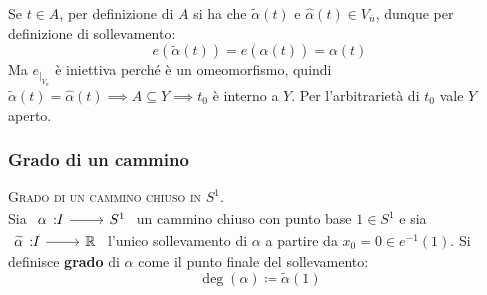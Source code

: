 \begin{demonstration}
\begin{itemize}
	Se $t\in A$, per definizione di $A$ si ha che $\widetilde{\alpha}(t)$ e $\widehat{\alpha}(t)\in V_{\overline{n}}$, dunque per definizione di sollevamento:
	\begin{equation*}
		e\left( \widetilde{\alpha}(t) \right)= e\left( \widehat{\alpha}(t) \right)= \alpha(t)
	\end{equation*} 
	Ma $e_{\mid_{V_{\overline{n}}}}$ è iniettiva perché è un omeomorfismo, quindi $\widetilde{\alpha}(t)=\widehat{\alpha}(t) \implies A\subseteq Y \implies t_0$ è interno a $Y$. Per l'arbitrarietà di $t_0$ vale $Y$ aperto.
	\end{itemize}
\vspace{-3mm}
\end{demonstration}

\subsubsection{Grado di un cammino}
\begin{define} \textsc{Grado di un cammino chiuso in $S^1$.}\\
	Sia $\funz \alpha I {S^1}$ un cammino chiuso con punto base $1\in S^1$ e sia $\funz {\widetilde{\alpha}} I \realset$ l'unico sollevamento di $\alpha$ a partire da $x_0=0 \in e^{-1} (1)$. Si definisce \textbf{grado} di $\alpha$ come il punto finale del sollevamento:
	\begin{equation}
		\deg (\alpha)\coloneqq \widetilde{\alpha}(1)
	\end{equation}
\vspace{-6mm}
\end{define}


